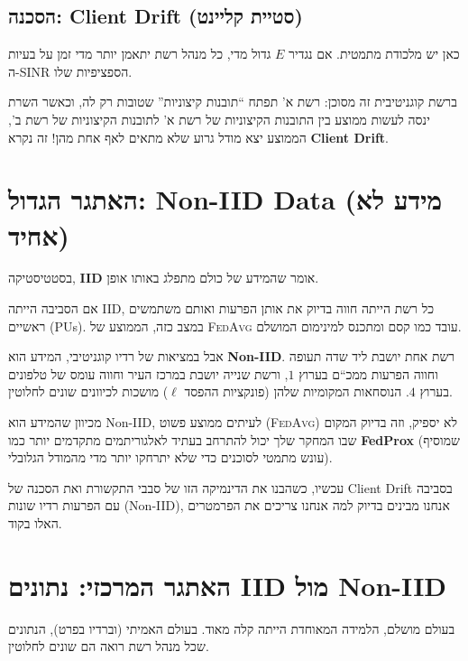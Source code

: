 \documentclass[11pt,a4paper]{article}
\newcommand{\loss}{\ell}
\newcommand{\FedAvg}{\textsc{FedAvg}}
\begin{document}
\subsection{הסכנה: Client Drift (סטיית קליינט)}

כאן יש מלכודת מתמטית.
אם נגדיר $E$ גדול מדי, כל מנהל רשת יתאמן יותר מדי זמן על בעיות ה-SINR הספציפיות שלו.

ברשת קוגניטיבית זה מסוכן: רשת א' תפתח ``תובנות קיצוניות'' שטובות רק לה, וכאשר השרת ינסה לעשות ממוצע בין התובנות הקיצוניות של רשת א' לתובנות הקיצוניות של רשת ב', הממוצע יצא מודל גרוע שלא מתאים לאף אחת מהן!
זה נקרא \textbf{Client Drift}.

\section{האתגר הגדול: Non-IID Data (מידע לא אחיד)}

בסטטיסטיקה, \textbf{IID} אומר שהמידע של כולם מתפלג באותו אופן.

אם הסביבה הייתה IID, כל רשת הייתה חווה בדיוק את אותן הפרעות ואותם משתמשים ראשיים (PUs).
במצב כזה, הממוצע של \FedAvg{} עובד כמו קסם ומתכנס למינימום המושלם.

אבל במציאות של רדיו קוגניטיבי, המידע הוא \textbf{Non-IID}.
רשת אחת יושבת ליד שדה תעופה וחווה הפרעות ממכ``ם בערוץ $1$, ורשת שנייה יושבת במרכז העיר וחווה עומס של טלפונים בערוץ $4$.
הנוסחאות המקומיות שלהן (פונקציות ההפסד $\loss$) מושכות לכיוונים שונים לחלוטין.

מכיוון שהמידע הוא Non-IID, לעיתים ממוצע פשוט (\FedAvg) לא יספיק, וזה בדיוק המקום שבו המחקר שלך יכול להתרחב בעתיד לאלגוריתמים מתקדמים יותר כמו \textbf{FedProx} (שמוסיף עונש מתמטי לסוכנים כדי שלא יתרחקו יותר מדי מהמודל הגלובלי).

עכשיו, כשהבנו את הדינמיקה הזו של סבבי התקשורת ואת הסכנה של Client Drift בסביבה עם הפרעות רדיו שונות (Non-IID), אנחנו מבינים בדיוק למה אנחנו צריכים את הפרמטרים האלו בקוד.

\section{האתגר המרכזי: נתונים IID מול Non-IID}

בעולם מושלם, הלמידה המאוחדת הייתה קלה מאוד.
בעולם האמיתי (וברדיו בפרט), הנתונים שכל מנהל רשת רואה הם שונים לחלוטין.
\end{document}
